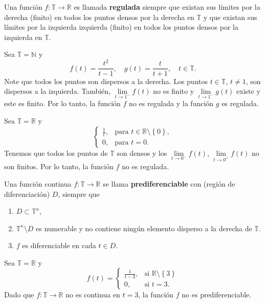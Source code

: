 \begin{frame}
\begin{definition}
Una función $f\colon\mathds{T}\rightarrow\mathds{R}$ es llamada \textbf{regulada} siempre que existan sus límites por la derecha (finito) en todos los puntos densos por la derecha en $\mathds{T}$ y que existan sus límites por la izquierda izquierda (finito) en todos los puntos densos por la izquierda en $\mathds{T}$.
\end{definition}

\begin{example}
Sea $\mathds{T}=\mathds{N}$ y \[ f\left(t\right)=\frac{t^{2}}{t-1},\quad g\left(t\right)=\frac{t}{t+1},\quad t\in\mathds{T}. \] Note que todos los puntos son dispersos a la derecha. Los puntos $t\in\mathds{T}$, $t\neq1$, son dispersos a la izquierda. También, $\lim\limits_{t\to1^{-}}f\left(t\right)$ no es finito y $\lim\limits_{t\to1^{-}}g\left(t\right)$ existe y este es finito. Por lo tanto, la función $f$ no es regulada y la función $g$ es regulada.
\end{example}

\begin{example}
Sea $\mathds{T}=\mathds{R}$ y \[ \begin{cases}\frac{1}{t},&\text{para }t\in\mathds{R}\setminus\left\{0\right\},\\0,&\text{para }t=0.\end{cases} \] Tenemos que todos los puntos de $\mathds{T}$ son densos y los $\lim\limits_{t\to 0^{-}}f\left(t\right)$, $\lim\limits_{t\to 0^{+}}f\left(t\right)$ no son finitos. Por lo tanto, la función $f$ no es regulada.
\end{example}
\end{frame}

\begin{frame}
	\begin{definition}
		Una función continua $f\colon\mathds{T}\rightarrow\mathds{R}$ se llama \textbf{prediferenciable} con (región de diferenciación) $D$, siempre que
		\begin{enumerate}
			\item $D\subset\mathds{T}^{\kappa}$,
			\item $\mathds{T}^{\kappa}\setminus D$ es numerable y no contiene ningún elemento disperso a la derecha de $\mathds{T}$.
			\item $f$ es diferenciable en cada $t\in D$.
		\end{enumerate}
	\end{definition}

	\begin{example}
		Sea $\mathds{T}=\mathds{R}$ y \[ f\left(t\right)=\begin{cases}\frac{1}{t-3},&\text{si }\mathds{R}\setminus\left\{3\right\}\\
		0,&\text{si }t=3.\end{cases} \] Dado que $f\colon\mathds{T}\rightarrow\mathds{R}$ no es continua en $t=3$, la función $f$ no es prediferenciable.
	\end{example}
\end{frame}

